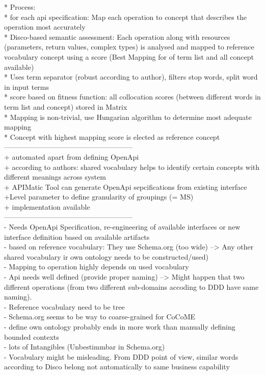 * Process: \\
* for each api specification: Map each operation to concept that describes the operation most accurately\\
* Disco-based semantic assessment: Each operation along with resources (parameters, return values, complex types) is analysed and mapped to reference vocabulary concept using a score (Best Mapping for of term list and all concept available)\\
* Uses term separator (robust according to author), filters stop words, split word in input terms\\
* score based on fitness function: all collocation scores (between different words in term list and concept) stored in Matrix\\
* Mapping is non-trivial, use Hungarian algorithm to determine most adequate mapping\\
* Concept with highest mapping score is elected as reference concept\\


------------------------------------------------------\\
+ automated apart from defining OpenApi\\
+ according to authors: shared vocabulary helps to identify certain concepts with different meanings across system\\
+ APIMatic Tool can generate OpenApi sepcifications from existing interface\\
+Level parameter to define granularity of groupings (= MS)\\
+ implementation available\\


------------------------------------------------------\\
- Needs OpenApi Specification, re-engineering of available interfaces or new interface definition based on available artifacts\\
- based on reference vocabulary: They use Schema.org (too wide) --> Any other shared vocabulary ir own ontology needs to be constructed/used)\\
- Mapping to operation highly depends on used vocabulary\\
- Api needs well defined (provide proper naming) --> Might happen that two different operations (from two different sub-domains accoding to DDD have same naming). \\
- Reference vocabulary need to be tree\\
- Schema.org seems to be way to coarse-grained for CoCoME\\
- define own ontology probably ends in more work than manually defining bounded contexts\\
- lots of Intangibles (Unbestimmbar in Schema.org)\\
- Vocabulary might be misleading. From DDD point of view, similar words according to Disco belong not automatically to same business capability\\


